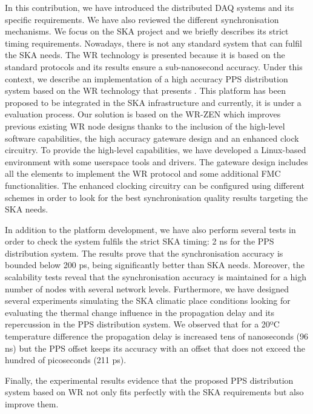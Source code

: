 In this contribution, we have introduced the distributed DAQ systems and its specific requirements. We have also reviewed the different synchronisation mechanisms. We focus on the SKA project and we briefly describes its strict timing requirements. Nowadays, there is not any standard system that can fulfil the SKA needs. The WR technology is presented because it is based on the standard protocols and its results ensure a sub-nanosecond accuracy. Under this context, we describe an implementation of a high accuracy PPS distribution system based on the WR technology that presents . This platform has been proposed to be integrated in the SKA infrastructure and currently, it is under a evaluation process. 
Our solution is based on the WR-ZEN which improves previous existing WR node designs 
thanks to the inclusion of the high-level software capabilities, the high accuracy gateware
design and an enhanced clock circuitry.
To provide the high-level capabilities, we have developed a Linux-based environment with some
userspace tools and drivers. The gateware design includes all the elements to implement the 
WR protocol and some additional FMC functionalities. The enhanced clocking circuitry can be configured using different schemes in order to look for the best synchronisation quality results targeting the SKA needs. 

In addition to the platform development, we have also perform several tests in order to check the system fulfils the strict SKA timing: 2 ns for the PPS distribution system. The results prove that the synchronisation accuracy is bounded below 200 ps, being significantly better than SKA needs. Moreover, the scalability tests reveal that the synchronisation accuracy is maintained for a high number of nodes with several network levels. Furthermore, we have 
designed several experiments simulating the SKA climatic place conditions 
looking for evaluating the thermal change influence in the propagation delay 
and its repercussion in the PPS distribution system. We observed that for a 
20ºC temperature difference the propagation delay is increased tens of 
nanoseconds (96 ns) but the PPS offset keeps its accuracy with an offset that 
does not exceed the hundred of picoseconds (211 ps). 

Finally, the experimental results evidence that the proposed PPS distribution system based on WR not only fits perfectly with the SKA requirements but also improve them.


